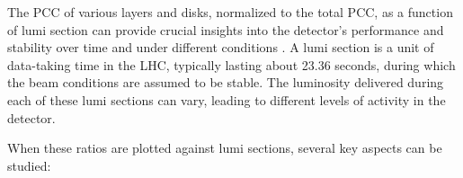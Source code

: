 


The PCC of various layers and disks, normalized to the total PCC, as a function of lumi section can provide crucial insights into the detector's performance and stability over time and under different conditions \cite{CMS-PAS-LUM-16-001}. A lumi section is a unit of data-taking time in the LHC, typically lasting about 23.36 seconds, during which the beam conditions are assumed to be stable. The luminosity delivered during each of these lumi sections can vary, leading to different levels of activity in the detector.

When these ratios are plotted against lumi sections, several key aspects can be studied:

